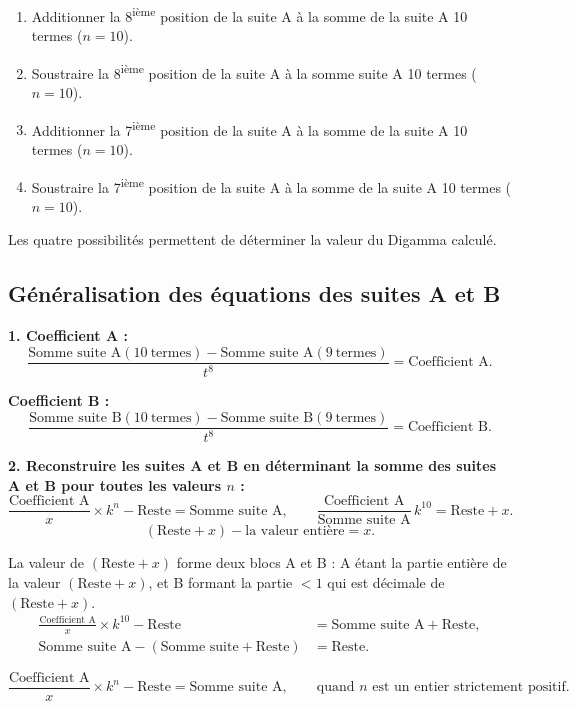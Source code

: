 \documentclass[11pt,a4paper]{article}
\begin{document}
\begin{enumerate}[nosep]
  \item Additionner la 8\textsuperscript{ième} position de la suite A à la somme de la suite A 10 termes ($n=10$).
  \item Soustraire la 8\textsuperscript{ième} position de la suite A à la somme suite A 10 termes ($n=10$).
  \item Additionner la 7\textsuperscript{ième} position de la suite A à la somme de la suite A 10 termes ($n=10$).
  \item Soustraire la 7\textsuperscript{ième} position de la suite A à la somme de la suite A 10 termes ($n=10$).
\end{enumerate}

Les quatre possibilités permettent de déterminer la valeur du Digamma calculé.

\subsection{Généralisation des équations des suites A et B}

\textbf{1. Coefficient A :}
\[
\frac{\text{Somme suite A}(10\ \text{termes}) - \text{Somme suite A}(9\ \text{termes})}{t^{8}}
= \text{Coefficient A}.
\]

\textbf{Coefficient B :}
\[
\frac{\text{Somme suite B}(10\ \text{termes}) - \text{Somme suite B}(9\ \text{termes})}{t^{8}}
= \text{Coefficient B}.
\]

\textbf{2. Reconstruire les suites A et B en déterminant la somme des suites A
et B pour toutes les valeurs $n$ :}
\[
\frac{\text{Coefficient A}}{x} \times k^{n} - \text{Reste} = \text{Somme suite A},
\qquad
\frac{\text{Coefficient A}}{\text{Somme suite A}}\, k^{10} = \text{Reste} + x .
\]
\[
(\text{Reste} + x) - \text{la valeur entière} = x .
\]

La valeur de $(\text{Reste} + x)$ forme deux blocs A et B : A étant la partie
entière de la valeur $(\text{Reste} + x)$, et B formant la partie $< 1$ qui est
décimale de $(\text{Reste} + x)$.
\begin{align*}
\frac{\text{Coefficient A}}{x}\times k^{10}-\text{Reste}
&=\text{Somme suite A}+\text{Reste},\\
\text{Somme suite A}-(\text{Somme suite}+\text{Reste})
&=\text{Reste}.
\end{align*}

\vspace{0.3cm}
\begin{boiteformule}
\[
\frac{\text{Coefficient A}}{x} \times k^{n} - \text{Reste} = \text{Somme suite A},
\qquad \text{quand } n \text{ est un entier strictement positif.}
\]
\end{boiteformule}
\end{document}
